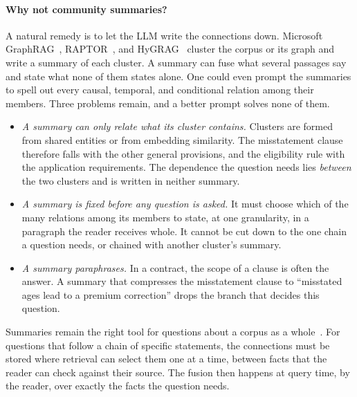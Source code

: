 \documentclass[sigconf, review, anonymous]{acmart}
\begin{document}
\paragraph{Why not community summaries?}
A natural remedy is to let the LLM write the connections down. Microsoft GraphRAG~\cite{edge2024local}, RAPTOR~\cite{sarthi2024raptor}, and HyGRAG~\cite{zhong2026hygrag} cluster the corpus or its graph and write a summary of each cluster. A summary can fuse what several passages say and state what none of them states alone. One could even prompt the summaries to spell out every causal, temporal, and conditional relation among their members. Three problems remain, and a better prompt solves none of them.
\begin{itemize}
  \item \emph{A summary can only relate what its cluster contains.} Clusters are formed from shared entities or from embedding similarity. The misstatement clause therefore falls with the other general provisions, and the eligibility rule with the application requirements. The dependence the question needs lies \emph{between} the two clusters and is written in neither summary.
  \item \emph{A summary is fixed before any question is asked.} It must choose which of the many relations among its members to state, at one granularity, in a paragraph the reader receives whole. It cannot be cut down to the one chain a question needs, or chained with another cluster's summary.
  \item \emph{A summary paraphrases.} In a contract, the scope of a clause is often the answer. A summary that compresses the misstatement clause to ``misstated ages lead to a premium correction'' drops the branch that decides this question.
\end{itemize}
Summaries remain the right tool for questions about a corpus as a whole~\cite{edge2024local}. For questions that follow a chain of specific statements, the connections must be stored where retrieval can select them one at a time, between facts that the reader can check against their source. The fusion then happens at query time, by the reader, over exactly the facts the question needs.
\end{document}
